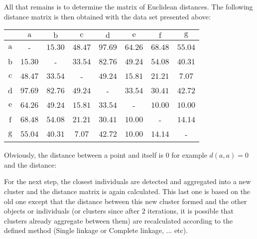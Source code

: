 	All that remains is to determine the matrix of Euclidean distances. The following distance matrix is then obtained with the data set presented above:
	\begin{table}[H]
		\centering
		\begin{tabular}{|c|c|c|c|c|c|c|c|}
		\hline
		 & $\mathrm{a}$ & $\mathrm{b}$ & $\mathrm{c}$ & $\mathrm{d}$ & $\mathrm{e}$ & $\mathrm{f}$ & $\mathrm{g}$ \\ \hline
		$\mathrm{a}$ & - & $15.30$ & $48.47$ & $97.69$ & $64.26$ & $68.48$ & $55.04$ \\ \hline
		$\mathrm{b}$ & $15.30$ & - & $33.54$ & $82.76$ & $49.24$ & $54.08$ & $40.31$ \\ \hline
		$\mathrm{c}$ & $48.47$ & $33.54$ & - & $49.24$ & $15.81$ & $21.21$ & $7.07$ \\ \hline
		$\mathrm{d}$ & $97.69$ & $82.76$ & $49.24$ & - & $33.54$ & $30.41$ & $42.72$ \\ \hline
		$\mathrm{e}$ & $64.26$ & $49.24$ & $15.81$ & $33.54$ & - & $10.00$ & $10.00$ \\ \hline
		$\mathrm{f}$ & $68.48$ & $54.08$ & $21.21$ & $30.41$ & $10.00$ & - & $14.14$ \\ \hline
		$\mathrm{g}$ & $55.04$ & $40.31$ & $7.07$ & $42.72$ & $10.00$ & $14.14$ & - \\ \hline
		\end{tabular}
	\end{table}
	Obviously, the distance between a point and itself is $0$ for example $d(a, a)=0$ and the distance:
	
	For the next step, the closest individuals are detected and aggregated into a new cluster and the distance matrix is again calculated. This last one is based on the old one except that the distance between this new cluster formed and the other objects or individuals (or clusters since after $2$ iterations, it is possible that clusters already aggregate between them) are recalculated according to the defined method (Single linkage or Complete linkage, ... etc).
	
